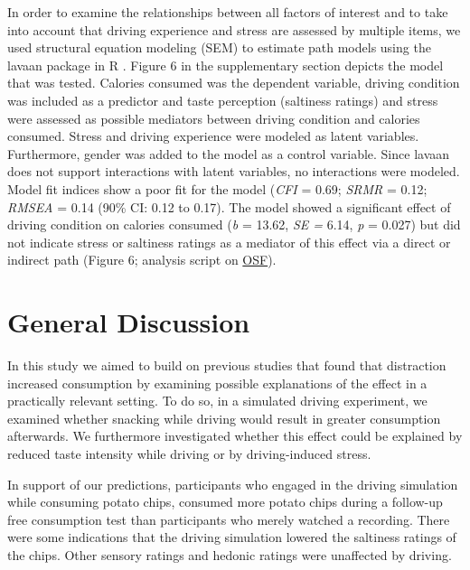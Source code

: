\documentclass[authordate, empirical, issue]{jote-new-article}
\begin{document}
In order to examine the relationships between all factors of interest and to take into account that driving experience and stress are assessed by multiple items, we used structural equation modeling (SEM) to estimate path models using the lavaan package in R \parencites{Rosseel2012}. Figure 6 in the supplementary section depicts the model that was tested. Calories consumed was the dependent variable, driving condition was included as a predictor and taste perception (saltiness ratings) and stress were assessed as possible mediators between driving condition and calories consumed. Stress and driving experience were modeled as latent variables. Furthermore, gender was added to the model as a control variable. Since lavaan does not support interactions with latent variables, no interactions were modeled. Model fit indices show a poor fit for the model (\emph{CFI} = 0.69; \emph{SRMR} = 0.12; \emph{RMSEA} = 0.14 (90\% CI: 0.12 to 0.17). The model showed a significant effect of driving condition on calories consumed (\emph{b }= 13.62, \emph{SE = }6.14, \emph{p }= 0.027) but did not indicate stress or saltiness ratings as a mediator of this effect via a direct or indirect path (Figure 6; analysis script on \href{https://osf.io/twg9r/}{OSF}).



\section{General Discussion}




In this study we aimed to build on previous studies that found that distraction increased consumption by examining possible explanations of the effect in a practically relevant setting. To do so, in a simulated driving experiment, we examined whether snacking while driving would result in greater consumption afterwards. We furthermore investigated whether this effect could be explained by reduced taste intensity while driving or by driving-induced stress.



In support of our predictions, participants who engaged in the driving simulation while consuming potato chips, consumed more potato chips during a follow-up free consumption test than participants who merely watched a recording. There were some indications that the driving simulation lowered the saltiness ratings of the chips. Other sensory ratings and hedonic ratings were unaffected by driving.
\end{document}
